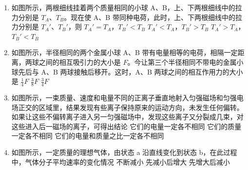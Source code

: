 \documentclass[\gkver]{gaokaozhenti}
\begin{document}
\begin{enumerate}
\item
如图所示，两根细线挂着两个质量相同的小球 A、B，上、下两根细线中的拉力分别是 $T_{A}$、$T_{B}$。现在使 A、B 带同种电荷，此时，上、下两根细线中的拉力分别是 $T_{A}'$、$T_{B}'$，则
\onepicture[h=2.97cm]{}
{$T_{A}' = T_{A}$，$T_{B}' < T_{B}$}
{$T_{A}' < T_{A}$，$T_{B}' > T_{B}$}
{$T_{A}' > T_{A}$，$T_{B}' < T_{B}$}

\item
如图所示，半径相同的两个金属小球 A、B 带有电量相等的电荷，相隔一定距离，两球之间的相互吸引力的大小是 $F$。今让第三个半径相同不带电的金属小球先后与 A、B 两球接触后移开。这时，A、B 两球之间的相互作用力的大小是
\onepicture[w=2.85cm]{}
{$\frac{1}{4}F$}
{$\frac{3}{8}F$}
{$\frac{3}{4}F$}

\item
如图所示，一束质量、速度和电量不同的正离子垂直地射入匀强磁场和匀强电场正交的区域里，结果发现有些离子保持原来的运动方向，未发生任何偏转。如果让这些不偏转离子进入另一匀强磁场中，发现这些离子又分裂成几束，对这些进入后一磁场的离子，可得出结论
\onepicture[w=4.63cm]{}
{它们的电量一定各不相同}
{它们的质量一定各不相同}
{它们的电量和质量之比一定各不相同}

\item
如图所示，一定质量的理想气体，由状态 a 沿直线变化到状态 b，在此过程中，气体分子平均速率的变化情况
\onepicture[h=4.27cm]{}
{不断减小}
{先减小后增大}
{先增大后减小}


\end{enumerate}
\end{document}
